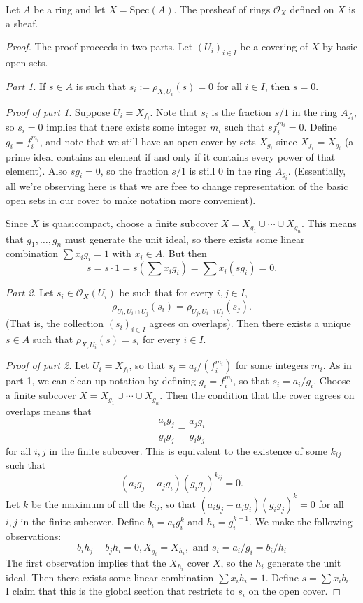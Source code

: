 \begin{proposition}
Let $ A$ be a ring and let $ X = \mathrm{Spec}(A)$. The presheaf of rings $ \mathcal{O}_X$ defined on $ X$ is a sheaf.
\end{proposition}

\begin{proof}
The proof proceeds in two parts. Let $ (U_i)_{i \in I}$ be a covering of $ X$ by basic open sets.

\emph{Part 1}. If $ s \in A$ is such that $ s_i := \rho_{X, U_i}(s) = 0$ for all $ i \in I$, then $ s = 0$.

\emph{Proof of part 1}. Suppose $ U_i = X_{f_i}$. Note that $ s_i$ is the fraction $ s/1$ in the ring $ A_{f_i}$, so $ s_i = 0$ implies that there exists some integer $ m_i$ such that $ sf_i^{m_i} = 0$. Define $ g_i = f_i ^{m_i}$, and note that we still have an open cover by sets $ X_{g_i}$ since $ X_{f_i} = X_{g_i}$ (a prime ideal contains an element if and only if it contains every power of that element). Also $ s g_i = 0$, so the fraction $ s/1$ is still $ 0$ in the ring $ A_{g_i}$. (Essentially, all we're observing here is that we are free to change representation of the basic open sets in our cover to make notation more convenient).

Since $ X$ is quasicompact, choose a finite subcover $ X = X_{g_1} \cup \dotsb \cup X_{g_n}$. This means that $ g_1, \dotsc, g_n$ must generate the unit ideal, so there exists some linear combination $ \sum x_i g_i = 1$ with $ x_i \in A$. But then
\[ s = s \cdot 1 = s \left( \sum x_i g_i \right) = \sum x_i (s g_i) = 0.\]

\emph{Part 2}. Let $ s_i \in \mathcal{O}_X(U_i)$ be such that for every $ i, j \in I$,
\[ \rho_{U_i, U_i \cap U_j}(s_i) = \rho_{U_j, U_i \cap U_j}(s_j).\]
(That is, the collection $ (s_i)_{i \in I}$ agrees on overlaps). Then there exists a unique $ s \in A$ such that $ \rho_{X, U_i}(s) = s_i$ for every $ i \in I$.

\emph{Proof of part 2}. Let $ U_i = X_{f_i}$, so that $ s_i = a_i/(f_i^{m_i})$ for some integers $ m_i$. As in part 1, we can clean up notation by defining $ g_i = f_i^{m_i}$, so that $ s_i = a_i/g_i$. Choose a finite subcover $ X = X_{g_1} \cup \dotsb \cup X_{g_n}$. Then the condition that the cover agrees on overlaps means that
\[ \frac{a_i g_j}{g_i g_j} = \frac{a_j g_i}{g_i g_j} \]
for all $ i, j$ in the finite subcover. This is equivalent to the existence of some $ k_{ij}$ such that
\[ (a_i g_j - a_j g_i) (g_i g_j)^{k_{ij}} = 0.\]
Let $ k$ be the maximum of all the $ k_{ij}$, so that $ (a_i g_j - a_j g_i)(g_i g_j)^k = 0$ for all $ i, j$ in the finite subcover. Define $ b_i = a_i g_i^k$ and $ h_i = g_i^{k+1}$. We make the following observations:
\[ b_i h_j - b_j h_i = 0, X_{g_i} = X_{h_i}, \text{ and } s_i = a_i/g_i = b_i/h_i \]
The first observation implies that the $ X_{h_i}$ cover $ X$, so the $ h_i$ generate the unit ideal. Then there exists some linear combination $ \sum x_i h_i = 1$. Define $ s = \sum x_i b_i$. I claim that this is the global section that restricts to $ s_i$ on the open cover.


\end{proof}

